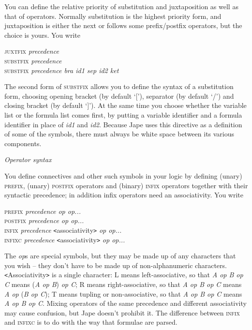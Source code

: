 \documentclass[11pt]{book}
\begin{document}
You can define the relative priority of substitution and juxtaposition as well as that of operators. Normally substitution is the highest priority form, and juxtaposition is either the next or follows some prefix/postfix operators, but the choice is yours. You write

\textsc{juxtfix} \textit{precedence}\\
\textsc{substfix} \textit{precedence}\\
\textsc{substfix} \textit{precedence bra id1 sep id2 ket}


The second form of \textsc{substfix} allows you to define the syntax of a substitution form, choosing opening bracket (by default `['), separator (by default `/') and closing bracket (by default `]'). At the same time you choose whether the variable list or the formula list comes first, by putting a variable identifier and a formula identifier in place of \textit{id1} and \textit{id2}. Because Jape uses this directive as a definition of some of the symbols, there must always be white space between its various components.


\textit{Operator syntax}


You define connectives and other such symbols in your logic by defining (unary) \textsc{prefix}, (unary) \textsc{postfix} operators and (binary) \textsc{infix} operators together with their syntactic precedence; in addition infix operators need an associativity. You write

\textsc{prefix} \textit{precedence op op...}\\
\textsc{postfix} \textit{precedence op op...}\\
\textsc{infix} \textit{precedence} \texttt{<}associativity\texttt{>} \textit{op op...}\\
\textsc{infixc} \textit{precedence} \texttt{<}associativity\texttt{>} \textit{op op...}


The \textit{op}s are special symbols, but they may be made up of any characters that you wish -- they don't have to be made up of non-alphanumeric characters. \texttt{<}Associativity\texttt{>} is a single character: L means left-associative, so that \textit{A op B op C} means (\textit{A op B}) \textit{op C}; R means right-associative, so that \textit{A op B op C} means \textit{A op} (\textit{B op C}); T means tupling or non-associative, so that \textit{A op B op C} means \textit{A op B op C}. Mixing operators of the same precedence and different associativity may cause confusion, but Jape doesn't prohibit it. The difference between \textsc{infix} and \textsc{infixc} is to do with the way that formulae are parsed.
\end{document}
